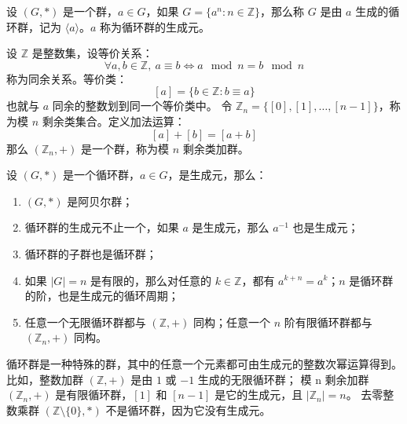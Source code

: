\begin{definition}
    设 $(G, *)$ 是一个群，$a\in G$，如果 $G = \{a^n : n\in\mathbb{Z}\}$，那么称 $G$ 是由 $a$ 生成的循环群，记为 $\langle a \rangle$。$a$ 称为循环群的生成元。
    \label{def:cyclic_group}
\end{definition}

\begin{definition}[模 n 剩余类加群]
    设 $\mathbb{Z}$ 是整数集，设等价关系：
    \[
        \forall a,b \in \mathbb{Z},\ a\equiv b \iff a \mod n = b \mod n
    \]
    称为同余关系。等价类：
    \[
        [a] = \{b\in\mathbb{Z} : b \equiv a\}
    \]
    也就与 $a$ 同余的整数划到同一个等价类中。
    令 $\mathbb{Z}_n = \{[0],[1],\ldots,[n-1]\}$，称为模 $n$ 剩余类集合。定义加法运算：
    \[
        [a] + [b] = [a + b]
    \]
    那么 $(\mathbb{Z}_n, +)$ 是一个群，称为模 $n$ 剩余类加群。
\end{definition}

\begin{proposition}[循环群的性质]
    设 $(G, *)$ 是一个循环群，$a\in G$，是生成元，那么：
    \begin{enumerate}
        \item $(G, *)$ 是阿贝尔群；
        \item 循环群的生成元不止一个，如果 $a$ 是生成元，那么 $a^{-1}$ 也是生成元；
        \item 循环群的子群也是循环群；
        \item 如果 $|G| = n$ 是有限的，那么对任意的 $k\in\mathbb{Z}$，都有 $a^{k+n} = a^k$；$n$ 是循环群的阶，也是生成元的循环周期；
        \item 任意一个无限循环群都与 $(\mathbb{Z}, +)$ 同构；任意一个 $n$ 阶有限循环群都与 $(\mathbb{Z}_n, +)$ 同构。
    \end{enumerate}
\end{proposition}

\begin{note}
    循环群是一种特殊的群，其中的任意一个元素都可由生成元的整数次幂运算得到。比如，整数加群 $(\mathbb{Z}, +)$ 是由 $1$ 或 $-1$ 生成的无限循环群；
    模 n 剩余加群 $(\mathbb{Z}_n,+)$ 是有限循环群，$[1]$ 和 $[n-1]$ 是它的生成元，且 $|\mathbb{Z}_n| = n$。
    去零整数乘群 $(\mathbb{Z}\setminus\{0\}, *)$ 不是循环群，因为它没有生成元。
\end{note}
\vspace{1em}

